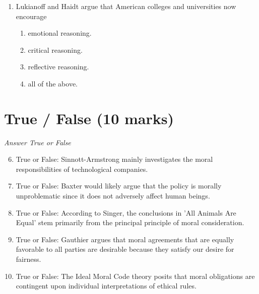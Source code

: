 \documentclass[12pt]{article}
\begin{document}
\begin{enumerate}[label=\arabic*.]
\begin{enumerate}[label=(\alph*)]
    \item Mengzi
    \item Zoroastrianism
    \item Zen Buddhism
    \item Shintoism
    \item Vedic Philosophy
\end{enumerate}
\item Lukianoff and Haidt argue that American colleges and universities now encourage
\begin{enumerate}[label=(\alph*)]
    \item emotional reasoning.
    \item critical reasoning.
    \item reflective reasoning.
    \item all of the above.
\end{enumerate}
\end{enumerate}

\section*{True / False (10 marks)}
\textit{Answer True or False}
\begin{enumerate}[label=\arabic*.]
\setcounter{enumi}{5}
\item True or False: Sinnott-Armstrong mainly investigates the moral responsibilities of technological companies.
\item True or False: Baxter would likely argue that the policy is morally unproblematic since it does not adversely affect human beings.
\item True or False: According to Singer, the conclusions in 'All Animals Are Equal' stem primarily from the principal principle of moral consideration.
\item True or False: Gauthier argues that moral agreements that are equally favorable to all parties are desirable because they satisfy our desire for fairness.
\item True or False: The Ideal Moral Code theory posits that moral obligations are contingent upon individual interpretations of ethical rules.
\end{enumerate}
\end{document}
